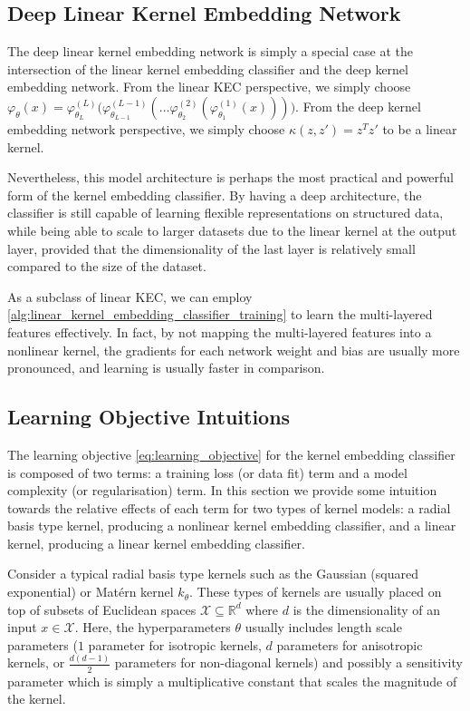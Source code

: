 \documentclass{article}
\begin{document}
	\subsection{Deep Linear Kernel Embedding Network}
	\label{app:deep_linear_kernel_embedding_network}

		The deep linear kernel embedding network is simply a special case at the intersection of the linear kernel embedding classifier and the deep kernel embedding network. From the linear KEC perspective, we simply choose $\varphi_{\theta}(x) = \varphi^{(L)}_{\theta_{L}}\big(\varphi^{(L - 1)}_{\theta_{L - 1}}(\dots\varphi^{(2)}_{\theta_{2}}(\varphi^{(1)}_{\theta_{1}}(x)))\big)$. From the deep kernel embedding network perspective, we simply choose $\kappa(z, z') = z^{T} z'$ to be a linear kernel.
		
		Nevertheless, this model architecture is perhaps the most practical and powerful form of the kernel embedding classifier. By having a deep architecture, the classifier is still capable of learning flexible representations on structured data, while being able to scale to larger datasets due to the linear kernel at the output layer, provided that the dimensionality of the last layer is relatively small compared to the size of the dataset.
		
		As a subclass of linear KEC, we can employ \cref{alg:linear_kernel_embedding_classifier_training} to learn the multi-layered features effectively. In fact, by not mapping the multi-layered features into a nonlinear kernel, the gradients for each network weight and bias are usually more pronounced, and learning is usually faster in comparison.
				
	\subsection{Learning Objective Intuitions}
	\label{app:learning_objective_intuitions}
	
		The learning objective \eqref{eq:learning_objective} for the kernel embedding classifier is composed of two terms: a training loss (or data fit) term and a model complexity (or regularisation) term. In this section we provide some intuition towards the relative effects of each term for two types of kernel models: a radial basis type kernel, producing a nonlinear kernel embedding classifier, and a linear kernel, producing a linear kernel embedding classifier.
		
		Consider a typical radial basis type kernels such as the Gaussian (squared exponential) or Mat\'{e}rn kernel $k_{\theta}$. These types of kernels are usually placed on top of subsets of Euclidean spaces $\mathcal{X} \subseteq \mathbb{R}^{d}$ where $d$ is the dimensionality of an input $x \in \mathcal{X}$. Here, the hyperparameters $\theta$ usually includes length scale parameters ($1$ parameter for isotropic kernels, $d$ parameters for anisotropic kernels, or $\frac{d (d - 1)}{2}$ parameters for non-diagonal kernels) and possibly a sensitivity parameter which is simply a multiplicative constant that scales the magnitude of the kernel.
		
\end{document}
